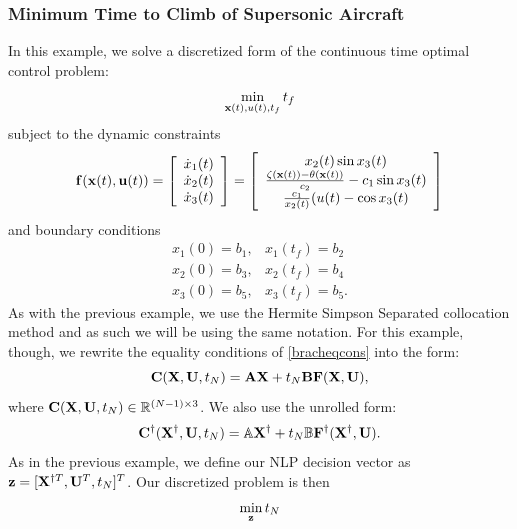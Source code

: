 \documentclass[10pt,pdftex]{article}
\begin{document}
\subsubsection{Minimum Time to Climb of Supersonic Aircraft}
In this example, we solve a discretized form of the continuous time optimal control problem:
\begin{equation}
\min\limits_{\mathbf{x}(t),u(t),t_f} t_f
\end{equation}
subject to the dynamic constraints
\begin{equation}
\mathbf{f}(\mathbf{x}(t),\mathbf{u}(t)) = 
\left[ \begin{array}{c}
\dot{x}_1(t) \\ \dot{x}_2(t)\\ \dot{x}_3(t)
\end{array} \right] = 
\left[ \begin{array}{c}
x_2(t) \sin x_3(t)\\
\frac{\zeta(\mathbf{x}(t))-\theta(\mathbf{x}(t))}{c_2}-c_1\sin x_3(t)\\
\frac{c_1}{x_2(t)}(u(t) - \cos x_3(t)
\end{array} \right]
\end{equation}
and boundary conditions
\begin{equation}
\begin{array}{ll}
x_1(0) =  b_1, & x_1(t_f) =  b_2 \\
x_2(0) =  b_3, & x_2(t_f) =  b_4 \\
x_3(0) =  b_5, & x_3(t_f) =  b_5.
\end{array}
\end{equation}
As with the previous example, we use the Hermite Simpson Separated collocation method and as such we will be using the same notation. For this example, though, we rewrite the equality conditions of \ref{bracheqcons} into the form:
\begin{equation}
\mathbf{C}(\mathbf{X},\mathbf{U},t_N) = \mathbf{A}\mathbf{X} + t_N\mathbf{B}\mathbf{F}(\mathbf{X},\mathbf{U}),
\end{equation}
where $\mathbf{C}(\mathbf{X},\mathbf{U},t_N) \in \mathbb{R}^{(N-1)\times 3}$. We also use the unrolled form:
\begin{equation}
\mathbf{C}^{\dag}(\mathbf{X}^{\dag},\mathbf{U},t_N) = \mathbb{A}\mathbf{X}^{\dag} + t_N\mathbb{B}\mathbf{F}^{\dag}(\mathbf{X}^{\dag},\mathbf{U}).
\end{equation}
As in the previous example, we define our NLP decision vector as $\mathbf{z} = [\mathbf{X}^{\dag T},\mathbf{U}^T,t_N]^T$.
Our discretized problem is then
\begin{equation}
\min\limits_{\mathbf{z}} t_N
\end{equation}
\end{document}
